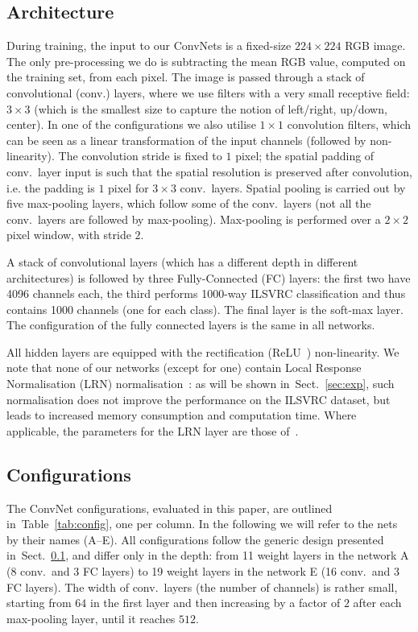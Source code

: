 \documentclass{article} %
\makeatletter
\newcommand{\tblref}[1]{Table~\ref{#1}}
\newcommand{\sref}[1]{Sect.~\ref{#1}}
\newcommand*{\ie}{i.e.\@\xspace}
\makeatother
\begin{document}
\subsection{Architecture}
\label{sec:arch}
During training, the input to our ConvNets is a fixed-size $224\times224$ RGB image. The only pre-processing we do is subtracting the mean RGB value, computed on the training set, from each pixel.
The image is passed through a stack of convolutional (conv.) layers, where we use filters with a very small receptive field: $3\times 3$ (which is the smallest size to capture the notion of 
left/right, up/down, center).
In one of the configurations we also utilise $1\times 1$ convolution filters, which can be seen as a linear transformation of the input channels (followed by non-linearity).
The convolution stride is fixed to $1$ pixel; the spatial padding of conv.\ layer input is such that the spatial resolution is preserved after convolution, \ie
the padding is $1$ pixel for $3\times3$ conv.\ layers.
Spatial pooling is carried out by five max-pooling layers, which follow some of the conv.\ layers (not all the conv.\ layers are followed by max-pooling).
Max-pooling is performed over a $2\times 2$ pixel window, with stride $2$.

A stack of convolutional layers (which has a different depth in different architectures) is followed by three Fully-Connected (FC) layers: the first
two have 4096 channels each, the third performs 1000-way ILSVRC classification and thus contains 1000 channels (one for each class). The final layer is the soft-max layer.
The configuration of the fully connected layers is the same in all networks. 

All hidden layers are equipped with the rectification (ReLU~\citep{Krizhevsky12}) non-linearity. 
We note that none of our networks (except for one) contain Local Response Normalisation (LRN) normalisation~\citep{Krizhevsky12}: as will be shown in~\sref{sec:exp}, such normalisation 
does not improve the performance on the ILSVRC dataset, but leads to increased memory consumption and computation time. 
Where applicable, the parameters for the LRN layer are those of~\citep{Krizhevsky12}.

\subsection{Configurations}
\label{sec:config}
The ConvNet configurations, evaluated in this paper, are outlined in~\tblref{tab:config}, one per column. In the following we will refer to the nets by their names 
(A--E). All configurations follow the generic design presented in~\sref{sec:arch}, and differ only in the depth: 
from 11 weight layers in the network A (8 conv.\ and 3 FC layers) to 19 weight layers in the network E (16 conv.\ and 3 FC layers).
The width of conv.\ layers (the number of channels) is rather small, starting from $64$ in the first layer and then increasing by a factor of $2$ after each max-pooling layer,
until it reaches $512$.
\end{document}
